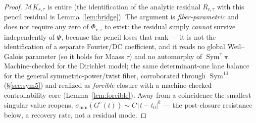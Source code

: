 \documentclass[11pt]{article}
\theoremstyle{definition}
\newcommand{\Sym}{\operatorname{Sym}}
\begin{document}
\begin{proof}
$\mathcal M K_{r,\tau}$ is entire (the identification of the analytic residual $R_{r,\tau}$ with this pencil residual is Lemma~\ref{lem:bridge}).
The argument is \emph{fiber-parametric} and does not require any zero of $\Phi_{r,\tau}$ to exist: the
residual simply \emph{cannot} survive independently of $\Phi$, because the pencil loses that rank --- it is
not the identification of a separate Fourier/DC coefficient, and it reads no global Weil--Galois parameter
(so it holds for Maass $\tau$) and no automorphy of $\Sym^r\pi$. Machine-checked for the Dirichlet model;
the same determinant-one lane balance for the general symmetric-power/twist fiber, corroborated through
$\Sym^{13}$ (\S\ref{sec:sym5}) and realized as \emph{forcible} closure with a machine-checked
controllability core (Lemma~\ref{lem:forcible}). Away from a coincidence the smallest singular value reopens,
$\sigma_{\min}(G^{\mathrm c}(t))\sim C\,|t-t_0|^{k}$ --- the post-closure resistance below, a recovery rate,
not a residual mode.
\end{proof}
\end{document}
